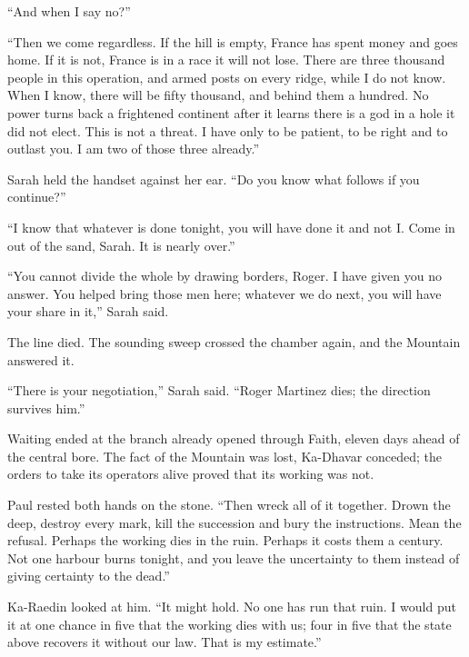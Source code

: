 ``And when I say no?''\par

``Then we come regardless. If the hill is empty, France has spent money and goes home. If it is not, France is in a race it will not lose. There are three thousand people in this operation, and armed posts on every ridge, while I do not know. When I know, there will be fifty thousand, and behind them a hundred. No power turns back a frightened continent after it learns there is a god in a hole it did not elect. This is not a threat. I have only to be patient, to be right and to outlast you. I am two of those three already.''\par

Sarah held the handset against her ear. ``Do you know what follows if you continue?''\par

``I know that whatever is done tonight, you will have done it and not I. Come in out of the sand, Sarah. It is nearly over.''\par

``You cannot divide the whole by drawing borders, Roger. I have given you no answer. You helped bring those men here; whatever we do next, you will have your share in it,'' Sarah said.\par

The line died. The sounding sweep crossed the chamber again, and the Mountain answered it.\par

``There is your negotiation,'' Sarah said. ``Roger Martinez dies; the direction survives him.''\par

Waiting ended at the branch already opened through Faith, eleven days ahead of the central bore. The fact of the Mountain was lost, Ka-Dhavar conceded; the orders to take its operators alive proved that its working was not.\par

Paul rested both hands on the stone. ``Then wreck all of it together. Drown the deep, destroy every mark, kill the succession and bury the instructions. Mean the refusal. Perhaps the working dies in the ruin. Perhaps it costs them a century. Not one harbour burns tonight, and you leave the uncertainty to them instead of giving certainty to the dead.''\par

Ka-Raedin looked at him. ``It might hold. No one has run that ruin. I would put it at one chance in five that the working dies with us; four in five that the state above recovers it without our law. That is my estimate.''\par

